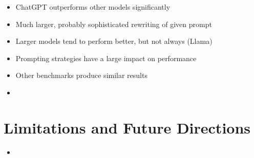 \begin{itemize}
    \item ChatGPT outperforms other models significantly
    \item Much larger, probably sophisticated rewriting of given prompt
    \item Larger models tend to perform better, but not always (Llama)
    \item Prompting strategies have a large impact on performance
    \item Other benchmarks produce similar results
    \item 
\end{itemize}

\section{Limitations and Future Directions}
\begin{itemize}
    \item 
\end{itemize}
